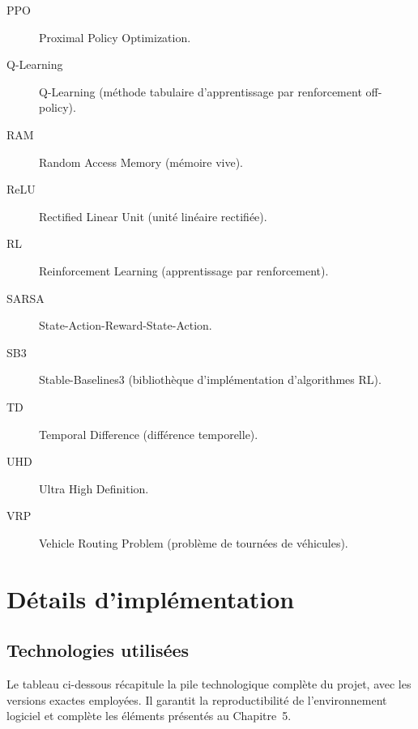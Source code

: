 \documentclass[11pt,a4paper]{report}
\begin{document}
\begin{description}
    \item[PPO] Proximal Policy Optimization.
    \item[Q-Learning] Q-Learning (méthode tabulaire d'apprentissage par renforcement off-policy).
    \item[RAM] Random Access Memory (mémoire vive).
    \item[ReLU] Rectified Linear Unit (unité linéaire rectifiée).
    \item[RL] Reinforcement Learning (apprentissage par renforcement).
    \item[SARSA] State-Action-Reward-State-Action.
    \item[SB3] Stable-Baselines3 (bibliothèque d’implémentation d’algorithmes RL).
    \item[TD] Temporal Difference (différence temporelle).
    \item[UHD] Ultra High Definition.
    \item[VRP] Vehicle Routing Problem (problème de tournées de véhicules).
\end{description}

\newpage




\appendix
{}

\chapter{Détails d'implémentation}
\label{ann:implementation}

\section*{Technologies utilisées}

Le tableau ci-dessous r\'ecapitule la pile technologique compl\`ete du projet, avec les versions exactes employ\'ees. Il garantit la reproductibilit\'e de l'environnement logiciel et compl\`ete les \'el\'ements pr\'esent\'es au Chapitre~5.
\end{document}
